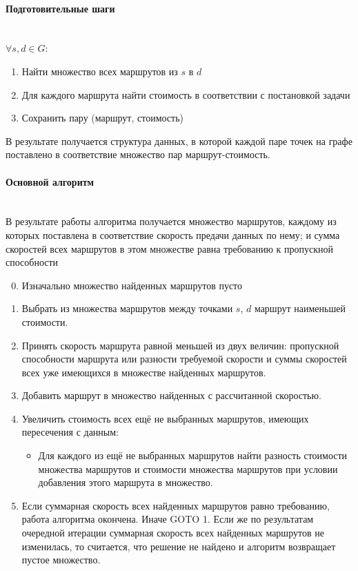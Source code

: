\documentclass[a4paper]{article}
\begin{document}
\paragraph{Подготовительные шаги}\mbox{}\\
$\forall s, d \in G: $
\begin{enumerate}
\item Найти множество всех маршрутов из $s$ в $d$
\item Для каждого маршрута найти стоимость в соответствии с постановкой задачи
\item Сохранить пару (маршрут, стоимость)
\end{enumerate}
В результате получается структура данных, в которой каждой паре точек на графе поставлено в соответствие множество пар маршрут-стоимость.

\paragraph{Основной алгоритм}\mbox{}\\
В результате работы алгоритма получается множество маршрутов, каждому из которых поставлена в соответствие скорость предачи данных по нему; и сумма скоростей всех маршрутов в этом множестве равна требованию к пропускной способности
\begin{enumerate}
\setcounter{enumi}{-1}
\item Изначально множество найденных маршрутов пусто
\item Выбрать из множества маршрутов между точками $s$, $d$ маршрут наименьшей стоимости.
\item Принять скорость маршрута равной меньшей из двух величин: пропускной способности маршрута или разности требуемой скорости и суммы скоростей всех уже имеющихся в множестве найденных маршрутов.
\item Добавить маршрут в множество найденных с рассчитанной скоростью. 
\item Увеличить стоимость всех ещё не выбранных маршрутов, имеющих пересечения с данным:
\begin{itemize}
\item Для каждого из ещё не выбранных маршрутов найти разность стоимости множества маршрутов и стоимости множества маршрутов при условии добавления этого маршрута в множество.
\end{itemize}
\item Если суммарная скорость всех найденных маршрутов равно требованию, работа алгоритма окончена. Иначе  GOTO 1. Если же по результатам очередной итерации суммарная скорость всех найденных маршрутов не изменилась, то считается, что решение не найдено и алгоритм возвращает пустое множество.
\end{enumerate}
\end{document}
